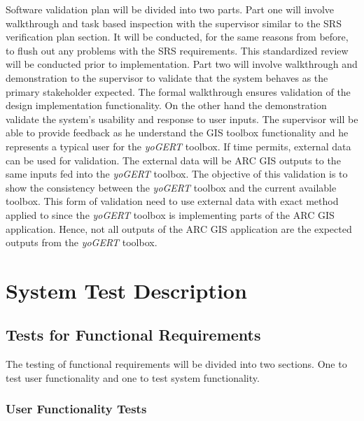 \documentclass[12pt, titlepage]{article}
\begin{document}
Software validation plan will be divided into two parts. Part one will involve walkthrough and task based inspection with the supervisor similar to the SRS 
verification plan section. It will be conducted, for the same reasons from before, to flush out any problems with the SRS requirements. This standardized review will be conducted prior to implementation. Part two will involve walkthrough and demonstration to the supervisor to validate that the system behaves as the primary stakeholder expected. The formal walkthrough ensures validation of the design implementation functionality. On the other hand the demonstration validate the system's usability and response to user inputs. The supervisor will be able to provide feedback as he understand the GIS toolbox functionality and he represents a typical user for the \emph{yoGERT} toolbox. 
If time permits, external data can be used for validation. The external data will be ARC GIS outputs to the same inputs fed into the \emph{yoGERT} toolbox. The objective of this validation is to show the consistency between the \emph{yoGERT} toolbox and the current available toolbox. This form of validation need to use external data with exact method applied to since the \emph{yoGERT} toolbox is implementing parts of the ARC GIS application. Hence, not all outputs of the ARC GIS application are the expected outputs from the \emph{yoGERT} toolbox.



\section{System Test Description}
	
\subsection{Tests for Functional Requirements}

The testing of functional requirements will be divided into two sections. One to test user functionality and one to test system functionality. 

\subsubsection{User Functionality Tests}
\end{document}

